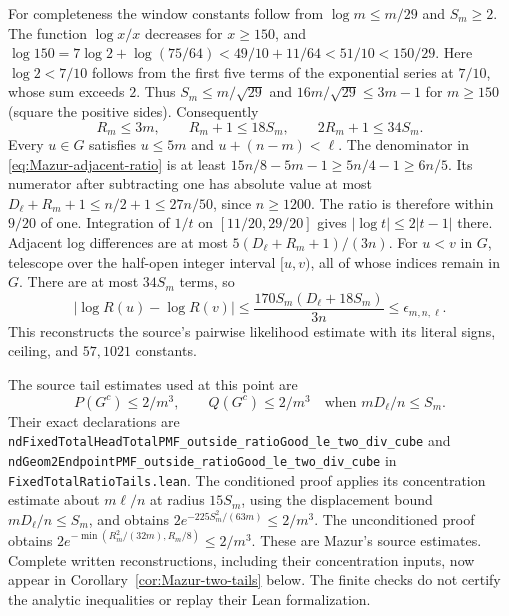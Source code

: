 For completeness the window constants follow from
$\log m\le m/29$ and $S_m\ge2$. The function $\log x/x$ decreases
for $x\ge150$, and
$\log150=7\log2+\log(75/64)<49/10+11/64<51/10<150/29$.
Here $\log2<7/10$ follows from the first five terms of the exponential
series at $7/10$, whose sum exceeds $2$.
Thus $S_m\le m/\sqrt{29}$ and
$16m/\sqrt{29}\le3m-1$ for $m\ge150$ (square the positive sides).
Consequently
\[
 R_m\le3m,\qquad R_m+1\le18S_m,\qquad 2R_m+1\le34S_m.
\]
Every $u\in G$ satisfies $u\le5m$ and $u+(n-m)<\ell$.
The denominator in \eqref{eq:Mazur-adjacent-ratio} is at least
$15n/8-5m-1\ge5n/4-1\ge6n/5$.
Its numerator after subtracting one has absolute value at most
$D_\ell+R_m+1\le n/2+1\le27n/50$, since $n\ge1200$.
The ratio is therefore within $9/20$ of one.
Integration of $1/t$ on $[11/20,29/20]$ gives
$|\log t|\le2|t-1|$ there. Adjacent log differences are at most
$5(D_\ell+R_m+1)/(3n)$.
For $u<v$ in $G$, telescope over the half-open integer interval
$[u,v)$, all of whose indices remain in $G$. There are at most $34S_m$
terms, so
\[
 |\log R(u)-\log R(v)|
 \le\frac{170S_m(D_\ell+18S_m)}{3n}
 \le\epsilon_{m,n,\ell}.
\]
This reconstructs the source's pairwise likelihood estimate with its
literal signs, ceiling, and $57,1021$ constants.

The source tail estimates used at this point are
\begin{equation}
 P(G^c)\le2/m^3,\qquad Q(G^c)\le2/m^3
 \quad\text{when }mD_\ell/n\le S_m.
 \label{eq:Mazur-tail-input}
\end{equation}
Their exact declarations are
\texttt{ndFixedTotalHeadTotalPMF\_outside\_ratioGood\_le\_two\_div\_cube}
and \texttt{ndGeom2EndpointPMF\_outside\_ratioGood\_le\_two\_div\_cube}
in \texttt{FixedTotalRatioTails.lean}.
The conditioned proof applies its concentration estimate about $m\ell/n$
at radius $15S_m$, using the displacement bound $mD_\ell/n\le S_m$,
and obtains $2e^{-225S_m^2/(63m)}\le2/m^3$.
The unconditioned proof obtains
$2e^{-\min(R_m^2/(32m),R_m/8)}\le2/m^3$.
These are Mazur's source estimates. Complete written reconstructions,
including their concentration inputs, now appear in
Corollary~\ref{cor:Mazur-two-tails} below. The finite checks do not
certify the analytic inequalities or replay their Lean formalization.


